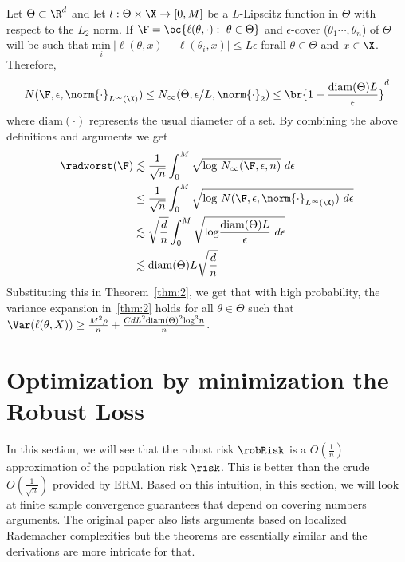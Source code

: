 \begin{example}
      Let $\Theta\subset\R^d$ and let
      $l:\Theta\times\X\rightarrow[0,M]$ be a $L$-Lipscitz function in
      $\Theta$ with respect to the $L_2$ norm. If
      $\F = \bc{\ell(\theta,\cdot):~\theta\in\Theta}$ and
      $\epsilon$-cover ($\theta_1\cdots,\theta_n$) of $\Theta$ will be
      such that
      $\underset{i}{\mathrm{min}}~|\ell(\theta, x) -
      \ell(\theta_i,x)|\le L\epsilon$ forall $\theta\in\Theta$ and
      $x\in\X$. Therefore,
      \[N(\F, \epsilon, \norm{\cdot}_{L^{\infty}(\X)} )\le
        N_{\infty}(\Theta,\epsilon/L, \norm{\cdot}_2)\le\br{1 +
          \dfrac{\mathrm{diam}(\Theta)L}{\epsilon}}^d\] where
      $\mathrm{diam}(\cdot)$ represents the usual diameter of a
      set. By combining the above definitions and arguments we get
      \begin{align*}
        \radworst(\F) &\lesssim
                        \dfrac{1}{\sqrt{n}}\int_{0}^M\sqrt{\mathrm{log}~N_{\infty}(\F,\epsilon,n)}~d\epsilon\\
                      &\le \dfrac{1}{\sqrt{n}}\int_{0}^M\sqrt{\mathrm{log}~N(\F,
                        \epsilon, \norm{\cdot}_{L^{\infty}(\X)}
                        )~d\epsilon}\\
                      &\lesssim
                        \sqrt{\dfrac{d}{n}} \int_{0}^M \sqrt{\mathrm{log}
                        \dfrac{\mathrm{diam} (\Theta)L}{\epsilon}~d\epsilon}\\
                      & \lesssim \mathrm{diam}(\Theta)L\sqrt{\dfrac{d}{n}}
      \end{align*}
      Substituting this in Theorem~\ref{thm:2}, we get that with high
      probability, the variance expansion in~\eqref{thm:2} holds for
      all $\theta\in\Theta$ such that
      $\Var(\ell(\theta, X))\ge \frac{M^2\rho}{n}+
      \frac{CdL^2\mathrm{diam}(\Theta)^2\mathrm{log}^3n}{n}$.
    \end{example}


\section{Optimization by minimization the Robust Loss}
\label{sec:optim-robust-loss}

In this section, we will see that the robust risk $\robRisk$ is a
$O(\frac{1}{n})$ approximation of the population risk $\risk$. This is
better than the crude $O(\frac{1}{\sqrt{n}})$ provided by ERM. Based
on this intuition, in this section, we will look at finite sample
convergence guarantees that depend on covering numbers arguments. The
original paper also lists arguments based on localized Rademacher
complexities but the theorems are essentially similar and the
derivations are more intricate for that.

